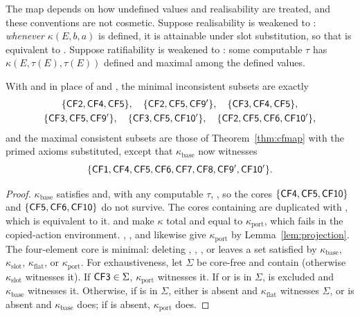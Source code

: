The map depends on how undefined values and realisability are treated, and these conventions are not
cosmetic. Suppose realisability is weakened to : \emph{whenever} $\kappa(E,b,a)$ is defined,
it is attainable under slot substitution, so that  is equivalent to . Suppose
ratifiability is weakened to : some computable $\tau$ has $\kappa(E,\tau(E),\tau(E))$ defined
and maximal among the defined values.

\begin{proposition}\label{prop:cfmapconditional}
With  and  in place of  and , the minimal inconsistent subsets
are exactly
\begin{gather*}
  \{\textup{\textsf{CF2}},\textup{\textsf{CF4}},\textup{\textsf{CF5}}\},\quad \{\textup{\textsf{CF2}},\textup{\textsf{CF5}},\textup{\textsf{CF9$'$}}\},\quad
  \{\textup{\textsf{CF3}},\textup{\textsf{CF4}},\textup{\textsf{CF5}}\},\\ \{\textup{\textsf{CF3}},\textup{\textsf{CF5}},\textup{\textsf{CF9$'$}}\},\quad
  \{\textup{\textsf{CF3}},\textup{\textsf{CF5}},\textup{\textsf{CF10$'$}}\},\quad \{\textup{\textsf{CF2}},\textup{\textsf{CF5}},\textup{\textsf{CF6}},\textup{\textsf{CF10$'$}}\},
\end{gather*}
and the maximal consistent subsets are those of Theorem~\ref{thm:cfmap} with the primed axioms
substituted, except that $\kappa_{\mathrm{base}}$ now witnesses
\[
  \{\textup{\textsf{CF1}},\textup{\textsf{CF4}},\textup{\textsf{CF5}},\textup{\textsf{CF6}},\textup{\textsf{CF7}},\textup{\textsf{CF8}},\textup{\textsf{CF9$'$}},\textup{\textsf{CF10$'$}}\}.
\]
\end{proposition}

\begin{proof}
$\kappa_{\mathrm{base}}$ satisfies  and, with any computable $\tau$, , so the cores
$\{\textup{\textsf{CF4}},\textup{\textsf{CF5}},\textup{\textsf{CF10}}\}$ and $\{\textup{\textsf{CF5}},\textup{\textsf{CF6}},\textup{\textsf{CF10}}\}$ do not survive. The cores containing
 are duplicated with , which is equivalent to it.  and  make $\kappa$
total and equal to $\kappa_{\mathrm{port}}$, which fails  in the copied-action environment.
, , and  likewise give $\kappa_{\mathrm{port}}$ by Lemma~\ref{lem:projection}. The
four-element core is minimal: deleting , , , or  leaves a set satisfied
by $\kappa_{\mathrm{base}}$, $\kappa_{\mathrm{slot}}$, $\kappa_{\mathrm{flat}}$, or $\kappa_{\mathrm{port}}$.
For exhaustiveness, let $\Sigma$ be core-free and contain  (otherwise $\kappa_{\mathrm{slot}}$
witnesses it). If $\textup{\textsf{CF3}}\in\Sigma$, $\kappa_{\mathrm{port}}$ witnesses it. If  or  is in
$\Sigma$,  is excluded and $\kappa_{\mathrm{base}}$ witnesses it. Otherwise, if  is in
$\Sigma$, either  is absent and $\kappa_{\mathrm{flat}}$ witnesses $\Sigma$, or  is absent
and $\kappa_{\mathrm{base}}$ does; if  is absent, $\kappa_{\mathrm{port}}$ does.
\end{proof}

